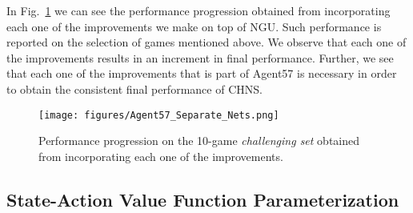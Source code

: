 \documentclass{article}
\begin{document}
In Fig.~\ref{fig:progression} we can see the performance progression obtained from incorporating each one of the improvements we make on top of NGU. Such performance is reported on the selection of  games mentioned above. We observe that each one of the improvements results in an increment in final performance. Further, we see that each one of the improvements that is part of Agent57 is necessary in order to obtain the consistent final performance of  CHNS.

\begin{figure}[!t]
    \centering
    \texttt{[image: figures/Agent57\_Separate\_Nets.png]}
    \caption{Performance progression on the 10-game \emph{challenging set} obtained from incorporating each one of the improvements.} 
    \label{fig:progression}
\end{figure}

\subsection{State-Action Value Function Parameterization}
\label{subsec:value2}
 
\end{document}
